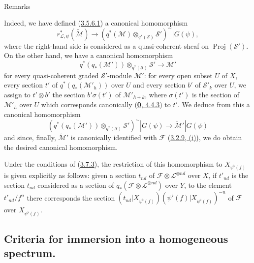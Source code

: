 \begin{namedtheorem}[3.7.9]{Remarks}
\begin{enumerate}
    Indeed, we have defined \textup{(\hyperref[II.3.5.6.1]{3.5.6.1})} a
    canonical homomorphism
    \[
    \label{II.3.7.9.3}
      r_{\mathcal{L},\psi}^*(\widetilde{\mathcal{M}})
      \longrightarrow
      (q^*(\mathcal{M})\otimes_{q^*(\mathcal{S})}\mathcal{S}')^{\sim}
      |G(\psi),
    \tag{3.7.9.3}
    \]
    where the right-hand side is considered as a quasi-coherent sheaf on
    $\operatorname{Proj}(\mathcal{S}')$. On the other hand, we have a
    canonical homomorphism
    \[
    \label{II.3.7.9.4}
      q^*(q_*(\mathcal{M}'))\otimes_{q^*(\mathcal{S})}\mathcal{S}'
      \longrightarrow\mathcal{M}'
    \tag{3.7.9.4}
    \]
    for every quasi-coherent graded $\mathcal{S}'$-module $\mathcal{M}'$:
    for every open subset $U$ of $X$, every section $t'$ of
    $q^*(q_*(\mathcal{M}'_h))$ over $U$ and every section $b'$ of
    $\mathcal{S}'_k$ over $U$, we assign to $t'\otimes b'$ the
    section $b'\sigma(t')$ of $\mathcal{M}'_{h+k}$, where $\sigma(t')$ is the
    section of $\mathcal{M}'_h$ over $U$ which corresponds canonically
    \textup{(\hyperref[0.4.4.3]{\textbf{0}, 4.4.3})} to $t'$. We deduce from this a
    canonical homomorphism
    \[
    \label{II.3.7.9.5}
      (q^*(q_*(\mathcal{M}'))\otimes_{q^*(\mathcal{S})}\mathcal{S}')^{\sim}
      |G(\psi)\longrightarrow\widetilde{\mathcal{M}}'|G(\psi)
    \tag{3.7.9.5}
    \]
    and since, finally, $\widetilde{\mathcal{M}}'$ is canonically identified
    with $\mathcal{F}$
    \textup{(\hyperref[II.3.2.9]{3.2.9, (i)})}, we do obtain the desired canonical
    homomorphism.

    Under the conditions of \textup{(\hyperref[II.3.7.3]{3.7.3})}, the restriction
    of this homomorphism to $X_{\psi^\flat(f)}$ is given explicitly as
    follows: given a section $t_{nd}$ of
    $\mathcal{F}\otimes\mathcal{L}^{\otimes nd}$ over $X$, if
    $t'_{nd}$ is the section $t_{nd}$ considered as a section of
    $q_*(\mathcal{F}\otimes\mathcal{L}^{\otimes nd})$ over $Y$, to
    the element $t'_{nd}/f^n$ there corresponds the section
    $(t_{nd}|X_{\psi^\flat(f)})
    (\psi^\flat(f)|X_{\psi^\flat(f)})^{-n}$ of $\mathcal{F}$ over
    $X_{\psi^\flat(f)}$.
\end{enumerate}
\end{namedtheorem}



\subsection{Criteria for immersion into a homogeneous spectrum.}
\label{subsection:II.3.8}

